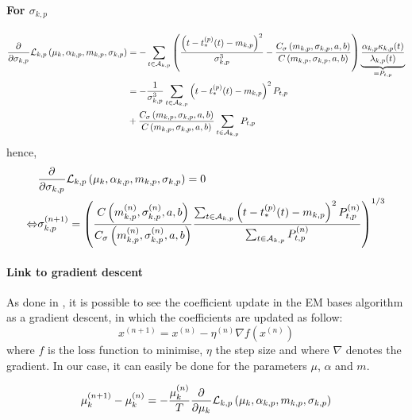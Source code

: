 \paragraph{For $\sigma_{k,p}$}
\begin{equation}
\begin{split}
    \frac{\partial^{}}{\partial {\sigma_{k,p}}^{}}\mathcal{L}_{k,p}\left( \mu_k, \alpha_{k,p}, m_{k,p}, \sigma_{k,p} \right) &= -\sum_{t\in\mathcal{A}_{k,p}} \left( \frac{\left( t - t_*^{(p)}(t) - m_{k,p} \right)^2}{\sigma_{k,p}^3} - \frac{C_\sigma\left( m_{k,p}, \sigma_{k,p},a,b \right)}{C\left( m_{k,p}, \sigma_{k,p},a,b \right)} \right)\underbrace{\frac{\alpha_{k,p}\kappa_{k,p}(t)}{\lambda_{k,p}(t)}}_{=P_{t,p}} \\
    &= -\frac{1}{\sigma_{k,p}^3} \sum_{t\in\mathcal{A}_{k,p}} \left( t - t_*^{(p)}(t) - m_{k,p} \right)^2 P_{t,p} \\
    &+  \frac{C_\sigma\left( m_{k,p}, \sigma_{k,p},a,b \right)}{C\left( m_{k,p}, \sigma_{k,p},a,b \right)} \sum_{t\in\mathcal{A}_{k,p}} P_{t,p}
\end{split}
\end{equation}
hence,
\begin{equation}
\begin{split}
    &\frac{\partial^{}}{\partial {\sigma_{k,p}}^{}}\mathcal{L}_{k,p}\left( \mu_k, \alpha_{k,p}, m_{k,p}, \sigma_{k,p} \right) = 0 \\
    \Leftrightarrow &\sigma_{k,p}^{(n+1)} = \left( \frac{C\left( m_{k,p}^{(n)}, \sigma_{k,p}^{(n)},a,b \right)}{C_\sigma\left( m_{k,p}^{(n)}, \sigma_{k,p}^{(n)},a,b \right)} \frac{\sum_{t\in\mathcal{A}_{k,p}} \left( t - t_*^{(p)}(t) - m_{k,p} \right)^2 P_{t,p}^{(n)}}{\sum_{t\in\mathcal{A}_{k,p}}  P_{t,p}^{(n)}} \right)^{1/3}
\end{split}
\end{equation}

\paragraph{Link to gradient descent} As done in \cite{lewis2011nonparametric}, it is possible to see the coefficient update in the EM bases algorithm as a gradient descent, in which the coefficients are updated as follow:
\begin{equation}
    x^{(n+1)} = x^{(n)} - \eta^{(n)} \nabla f(x^{(n)})
\end{equation}
where $f$ is the loss function to minimise, $\eta$ the step size and where $\nabla$ denotes the gradient.
In our case, it can easily be done for the parameters $\mu$, $\alpha$ and $m$.

\begin{equation}
    \mu_k^{(n+1)} - \mu_k^{(n)} = -\frac{\mu_k^{(n)}}{T} \frac{\partial^{}}{\partial {\mu_k}^{}}\mathcal{L}_{k,p}\left( \mu_k, \alpha_{k,p}, m_{k,p}, \sigma_{k,p} \right)
\end{equation}

